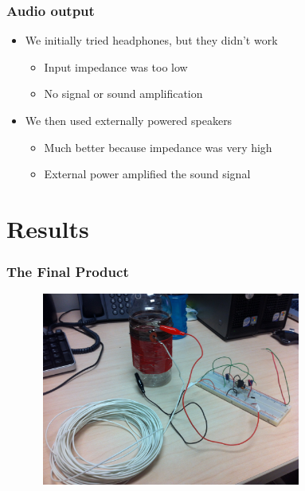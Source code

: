 \documentclass[11pt]{beamer}
\theoremstyle{definition}
\begin{document}
            \begin{frame}
            \frametitle{Audio output}
                \begin{itemize}
                    \item We initially tried headphones, but they didn't work
                    \vspace{1mm}
                    \begin{itemize}
                        \item Input impedance was too low
                        \vspace{1.5mm}
                        \item No signal or sound amplification
                    \end{itemize}
                    \vspace{2mm}
                    \item We then used externally powered speakers
                    \vspace{1mm}
                    \begin{itemize}
                        \item  Much better because impedance was very high
                        \vspace{1.5mm}
                        \item External power amplified the sound signal
                    \end{itemize}
                \end{itemize}
            \end{frame}


      \section{Results}
         \begin{frame}
              \frametitle{The Final Product}
              \centering
              \includegraphics[height=2.5in, width=4.3in]{Figures/everything.jpeg}
         \end{frame}
\end{document}

